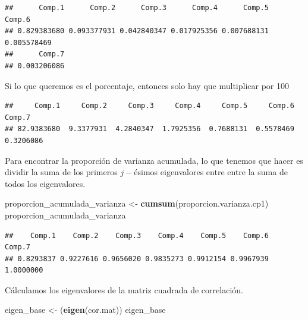 \documentclass[
]{book}
\newenvironment{Shaded}{\begin{snugshade}}{\end{snugshade}}
\newcommand{\DecValTok}[1]{\textcolor[rgb]{0.00,0.00,0.81}{#1}}
\newcommand{\FunctionTok}[1]{\textcolor[rgb]{0.13,0.29,0.53}{\textbf{#1}}}
\newcommand{\NormalTok}[1]{#1}
\newcommand{\OtherTok}[1]{\textcolor[rgb]{0.56,0.35,0.01}{#1}}
\newcommand{\SpecialCharTok}[1]{\textcolor[rgb]{0.81,0.36,0.00}{\textbf{#1}}}
\begin{document}
\begin{verbatim}
##      Comp.1      Comp.2      Comp.3      Comp.4      Comp.5      Comp.6 
## 0.829383680 0.093377931 0.042840347 0.017925356 0.007688131 0.005578469 
##      Comp.7 
## 0.003206086
\end{verbatim}

Si lo que queremos es el porcentaje, entonces solo hay que multiplicar por 100

\begin{Shaded}
\end{Shaded}

\begin{verbatim}
##     Comp.1     Comp.2     Comp.3     Comp.4     Comp.5     Comp.6     Comp.7 
## 82.9383680  9.3377931  4.2840347  1.7925356  0.7688131  0.5578469  0.3206086
\end{verbatim}

Para encontrar la proporción de varianza acumulada, lo que tenemos que hacer es dividir la suma de los primeros \(j-\)ésimos eigenvalores entre entre la suma de todos los eigenvalores.

\begin{Shaded}
\begin{Highlighting}[]
\NormalTok{proporcion\_acumulada\_varianza }\OtherTok{\textless{}{-}} \FunctionTok{cumsum}\NormalTok{(proporcion.varianza.cp1)}
\NormalTok{proporcion\_acumulada\_varianza}
\end{Highlighting}
\end{Shaded}

\begin{verbatim}
##    Comp.1    Comp.2    Comp.3    Comp.4    Comp.5    Comp.6    Comp.7 
## 0.8293837 0.9227616 0.9656020 0.9835273 0.9912154 0.9967939 1.0000000
\end{verbatim}

Cálculamos los eigenvalores de la matriz cuadrada de correlación.

\begin{Shaded}
\begin{Highlighting}[]
\NormalTok{eigen\_base }\OtherTok{\textless{}{-}}\NormalTok{ (}\FunctionTok{eigen}\NormalTok{(cor.mat))}
\NormalTok{eigen\_base}
\end{Highlighting}
\end{Shaded}
\end{document}
